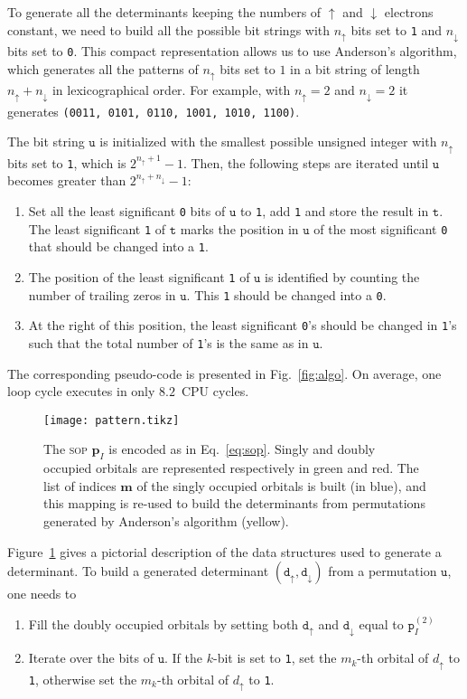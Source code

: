 \documentclass[aip,jcp,reprint,showkeys]{revtex4-1}
\newcommand{\tu}{\mathtt{u}}
\newcommand{\ttt}{\mathtt{t}}
\newcommand{\md}{\mathtt{d}}
\newcommand{\mpp}{\mathtt{p}}
\newcommand{\mpv}{\mathbf{p}}
\newcommand{\up}{\uparrow}
\newcommand{\dn}{\downarrow}
\newcommand{\one}{{\texttt{1}}}
\newcommand{\zero}{{\texttt{0}}}
\newcommand{\sop}{\textsc{sop}}
\begin{document}
To generate all the determinants keeping the numbers of $\up$ and $\dn$
electrons constant, we need to build all the possible bit strings with $n_\up$
bits set to \one{} and $n_\dn$ bits set to \zero{}.
This compact representation allows us to use Anderson's algorithm,\cite{NextBit}
which generates all
the patterns of $n_\up$ bits set to $1$ in a bit string of length $n_\up+n_\dn$
in lexicographical order. For example, with $n_\up=2$ and $n_\dn=2$
it generates \texttt{(0011, 0101, 0110, 1001, 1010, 1100)}.

The bit string $\tu$ is initialized with the smallest possible unsigned integer with
$n_\up$ bits set to \one, which is $2^{n_\up+1}-1$. Then, the
following steps are iterated until $\tu$ becomes greater than $2^{n_\up+n_\dn}-1$:
\begin{enumerate}
    \item Set all the least significant \zero{} bits of $\tu$ to \one{}, add \one{} and store the result in $\ttt$. The least significant \one{} of $\ttt$ marks the position in $\tu$ of the most significant \zero{} that should be changed into a \one{}.
    \item The position of the least significant \one{} of $\tu$ is identified by counting the number of trailing zeros in $\tu$. This \one{} should be changed into a \zero{}.
    \item At the right of this position, the least significant \zero's should be changed in \one's such that the total number of \one's is the same as in $\tu$.
\end{enumerate}
The corresponding pseudo-code is presented in Fig.~\ref{fig:algo}. On average, one loop cycle executes in only $8.2$~CPU cycles.

\begin{figure}[t]
\texttt{[image: pattern.tikz]} 
\caption{The {\sop} $\mpv_I$ is encoded as in Eq.~\eqref{eq:sop}. Singly and doubly
occupied orbitals are represented respectively in green and red.
The list of indices $\mathbf{m}$ of the singly occupied orbitals is built (in blue), and this
mapping is re-used to build the determinants from permutations generated by Anderson's algorithm (yellow).}
\label{fig:mapping}
\end{figure}

Figure~\ref{fig:mapping} gives a pictorial description of the data structures used to generate a determinant.
To build a generated determinant $(\md_\up,\md_\dn)$ from a permutation $\tu$, one needs to
\begin{enumerate}
    \item Fill the doubly occupied orbitals by setting both $\md_\up$ and $\md_\dn$
          equal to $\mpp_I^{(2)}$
    \item Iterate over the bits of $\tu$. If the $k$-bit is set to \one{}, set the $m_k$-th orbital of $d_\up$ to \one, otherwise set the $m_k$-th orbital of $d_\up$ to \one.
\end{enumerate}
\end{document}
